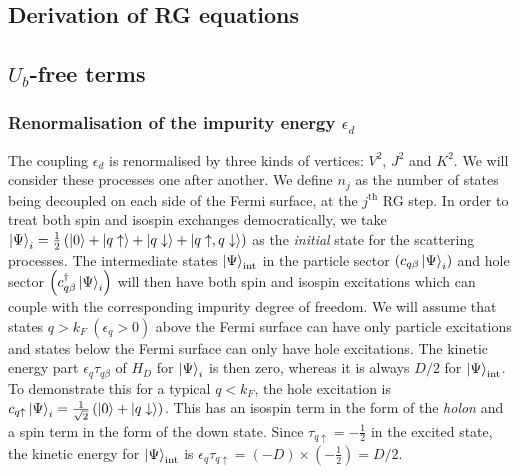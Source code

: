 \documentclass[10pt]{report}
\numberwithin{equation}{section}
\begin{document}
\begin{appendices}

\appendixtitleon

\chapter{Derivation of RG equations}
\section{\(U_b\)-free terms}
\subsection{Renormalisation of the impurity energy \(\epsilon_d\)}
The coupling \(\epsilon_d\) is renormalised by three kinds of vertices: \(V^2\), \(J^2\) and \(K^2\). We will consider these processes one after another. We define \(n_j\) as the number of states being decoupled on each side of the Fermi surface, at the \(j^\text{th}\) RG step. In order to treat both spin and isospin exchanges democratically, we take \(\ket{\Psi}_i = \frac{1}{2}\left(\ket{0} + \ket{q\uparrow} + \ket{q\downarrow} + \ket{q\uparrow, q\downarrow}\right) \) as the \textit{initial} state for the scattering processes. The intermediate states \(\ket{\Psi}_\text{int}\) in the particle sector \(\left(c_{q\beta}\ket{\Psi}_i\right)\) and hole sector \(\left(c^\dagger_{q\beta}\ket{\Psi}_i\right)\) will then have both spin and isospin excitations which can couple with the corresponding impurity degree of freedom. We will assume that states  \(q > k_F~\left(\epsilon_q > 0\right) \) above the Fermi surface can have only particle excitations and states below the Fermi surface can only have hole excitations. The kinetic energy part \(\epsilon_q \tau_{q\beta}\) of \(H_D\) for \(\ket{\Psi}_i\) is then zero, whereas it is always \(D/2\) for \(\ket{\Psi}_\text{int}\). To demonstrate this for a typical \(q < k_F\), the hole excitation is \(c_{q \uparrow}\ket{\Psi}_i = \frac{1}{\sqrt 2}\left(\ket{0} + \ket{q \downarrow}\right)\). This has an isospin term in the form of the \textit{holon} and a spin term in the form of the down state. Since \(\tau_{q \uparrow} = -\frac{1}{2}\) in the excited state, the kinetic energy for \(\ket{\Psi}_\text{int}\) is \(\epsilon_q \tau_{q \uparrow} = \left(-D\right)\times\left(-\frac{1}{2}\right) = D/2\).


\end{appendices}
\end{document}
